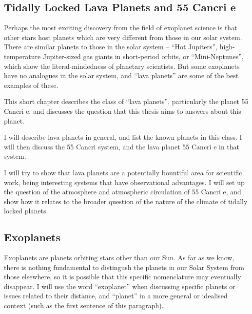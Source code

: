 \begin{SingleSpace}
\chapter{Tidally Locked Lava Planets and 55 Cancri e}\label{ch:lava-planets}
\vspace{0.5cm}
\end{SingleSpace}
\vspace{0.5cm}





Perhaps the most exciting discovery from the field of exoplanet science is that other stars host planets which are very different from those in our solar system. There are similar planets to those in the solar system -- ``Hot Jupiters'', high-temperature Jupiter-sized gas giants in short-period orbits, or ``Mini-Neptunes'', which show the literal-mindedness of planetary scientists. But some exoplanets have no analogues in the solar system, and ``lava planets'' are some of the best examples of these.


This short chapter describes the class of ``lava planets'', particularly the planet 55 Cancri e, and discusses the question that this thesis aims to answers about this planet.

I will describe lava planets in general, and list the known planets in this class. I will then discuss the 55 Cancri system, and the lava planet 55 Cancri e in that system.

I will try to show that lava planets are a potentially bountiful area for scientific work, being interesting systems that have observational advantages. I will set up the question of the atmosphere and atmospheric circulation of 55 Cancri e, and show how it relates to the broader question of the nature of the climate of tidally locked planets.


\section{Exoplanets}

Exoplanets are planets orbiting stars other than our Sun. As far as we know, there is nothing fundamental to distingush the planets in our Solar System from those elsewhere, so it is possible that this specific nomenclature may eventually disappear. I will use the word ``exoplanet''  when discussing specific planets or issues related to their distance, and ``planet'' in a more general or idealised context (such as the first sentence of this paragraph).

